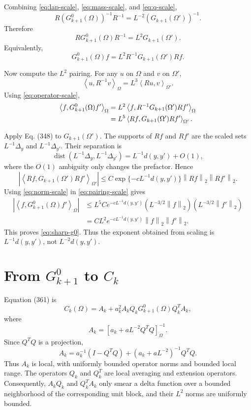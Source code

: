 \documentclass[11pt]{article}
\newcommand{\dist}{\operatorname{dist}}
\newcommand{\ip}[2]{\left\langle #1,#2\right\rangle}
\newcommand{\norm}[1]{\left\|#1\right\|}
\begin{document}
Combining \eqref{eq:lap-scale}, \eqref{eq:mass-scale}, and \eqref{eq:q-scale},
\[
  R\left(G^0_{k+1}(\Omega)\right)^{-1}R^{-1}
  =
  L^{-2}\left(G_{k+1}(\Omega')\right)^{-1}.
\]
Therefore
\begin{equation}
  RG^0_{k+1}(\Omega)R^{-1}
  =
  L^2G_{k+1}(\Omega').
  \label{eq:operator-scale}
\end{equation}
Equivalently,
\[
  G^0_{k+1}(\Omega)f
  =
  L^2R^{-1}G_{k+1}(\Omega')Rf.
\]

Now compute the \(L^2\) pairing.  For any \(u\) on \(\Omega\) and \(v\) on
\(\Omega'\),
\[
  \ip{u}{R^{-1}v}_{\Omega}
  =
  L^3\ip{Ru}{v}_{\Omega'}.
\]
Using \eqref{eq:operator-scale},
\begin{align}
  \ip{f}{G^0_{k+1}(\Omega)f'}_{\Omega}
  &=
  L^2\ip{f}{R^{-1}G_{k+1}(\Omega')Rf'}_{\Omega} \notag\\
  &=
  L^5\ip{Rf}{G_{k+1}(\Omega')Rf'}_{\Omega'}.
  \label{eq:pairing-scale}
\end{align}

Apply Eq. (348) to \(G_{k+1}(\Omega')\).  The supports of \(Rf\) and \(Rf'\) are
the scaled sets \(L^{-1}\Delta_y\) and \(L^{-1}\Delta_{y'}\).  Their separation is
\[
  \dist(L^{-1}\Delta_y,L^{-1}\Delta_{y'})
  =
  L^{-1}d(y,y')+O(1),
\]
where the \(O(1)\) ambiguity only changes the prefactor.  Hence
\[
  |\ip{Rf}{G_{k+1}(\Omega')Rf'}_{\Omega'}|
  \le
  C\exp\{-cL^{-1}d(y,y')\}\norm{Rf}_2\norm{Rf'}_2.
\]
Using \eqref{eq:norm-scale} in \eqref{eq:pairing-scale} gives
\begin{align*}
  |\ip{f}{G^0_{k+1}(\Omega)f'}_{\Omega}|
  &\le
  L^5 C e^{-cL^{-1}d(y,y')}
    (L^{-3/2}\norm{f}_2)(L^{-3/2}\norm{f'}_2)\\
  &=
  C L^2 e^{-cL^{-1}d(y,y')}\norm{f}_2\norm{f'}_2.
\end{align*}
This proves \eqref{eq:sharp-g0}.  Thus the exponent obtained from scaling is
\(L^{-1}d(y,y')\), not \(L^{-2}d(y,y')\).

\section*{From \(G^0_{k+1}\) to \(C_k\)}

Equation (361) is
\begin{equation}
  C_k(\Omega)
  =
  A_k+a_k^2A_kQ_kG^0_{k+1}(\Omega)Q_k^TA_k,
  \tag{361}
\end{equation}
where
\[
  A_k=\left[a_k+aL^{-2}Q^TQ\right]_{\Omega}^{-1}.
\]
Since \(Q^TQ\) is a projection,
\[
  A_k
  =
  a_k^{-1}(I-Q^TQ)+(a_k+aL^{-2})^{-1}Q^TQ.
\]
Thus \(A_k\) is local, with uniformly bounded operator norms and bounded local
range.  The operators \(Q_k\) and \(Q_k^T\) are local averaging and extension
operators.  Consequently, \(A_kQ_k\) and \(Q_k^TA_k\) only smear a delta function
over a bounded neighborhood of the corresponding unit block, and their \(L^2\)
norms are uniformly bounded.
\end{document}
